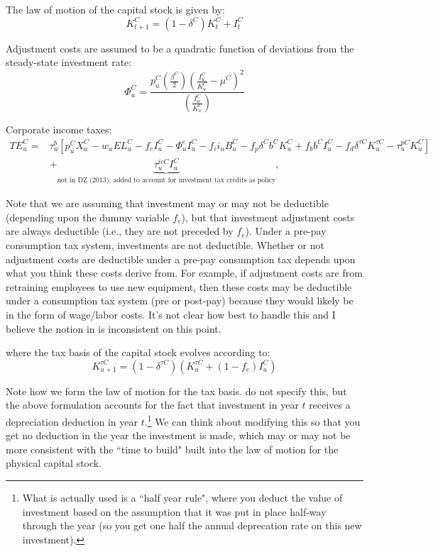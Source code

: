 The law of motion of the capital stock is given by:
\begin{equation}
\label{eqn:lom_capital}
K^{C}_{t+1}=(1-\delta^{C})K^{C}_{t} + I^{C}_{t}
\end{equation}

Adjustment costs are assumed to be a quadratic function of deviations from the steady-state investment rate:
\begin{equation}
\label{eqn:adj_cost}
\Phi^{C}_{u}=\frac{p^{C}_{u}\left(\frac{\beta^{C}}{2}\right)\left(\frac{I^{C}_{u}}{K^{C}_{u}}-\mu^{C}\right)^{2}}{\left(\frac{I^{C}_{u}}{K^{C}_{u}}\right)}
\end{equation}

Corporate income taxes:
\begin{equation}
\label{eqn:corp_tax}
\begin{split}
TE^{C}_{u}= & \tau^{b}_{u}\left[p^{C}_{u}X^{C}_{u}-w_{u}EL^{C}_{u}-f_{e}I^{C}_{u}-\Phi^{c}_{u}I^{C}_{u}-f_{i}i_{u}B^{C}_{u}-f_{p}\delta^{C}b^{C}K^{C}_{u}+f_{b}b^{C}I^{C}_{u}-f_{d}\delta^{\tau C}K^{\tau C}_{u}-\tau^{pC}_{u}K^{C}_{u}\right] \\
& +\underbrace{\tau^{icC}_{u}I^{C}_{u}}_{\text{not in DZ (2013), added to account for investment tax credits as policy}},
\end{split}
\end{equation}

\noindent\noindent  Note that we are assuming that investment may or may not be deductible (depending upon the dummy variable $f_{e}$), but that investment adjustment costs are always deductible (i.e., they are not preceded by $f_{e}$).  Under a pre-pay consumption tax system, investments are not deductible.  Whether or not adjustment costs are deductible under a pre-pay consumption tax depends upon what you think these costs derive from.  For example, if adjustment costs are from retraining employees to use new equipment, then these costs may be deductible under a consumption tax system (pre or post-pay) because they would likely be in the form of wage/labor costs. It's not clear how best to handle this and I believe the notion in \citet{DZ2013} is inconsistent on this point.

\noindent\noindent where the tax basis of the capital stock evolves according to:
\begin{equation}
\label{eqn:lom_taxcapital}
K^{\tau C}_{u+1}=(1-\delta^{\tau C})(K^{\tau C}_{u} + (1-f_{e})I^{C}_{u})
\end{equation}

Note how we form the law of motion for the tax basis.  \citet{DZ2013} do not specify this, but the above formulation accounts for the fact that investment in year $t$ receives a depreciation deduction in year $t$.\footnote{What is actually used is a ``half year rule", where you deduct the value of investment based on the assumption that it was put in place half-way through the year (so you get one half the annual deprecation rate on this new investment).}  We can think about modifying this so that you get no deduction in the year the investment is made, which may or may not be more consistent with the ``time to build" built into the law of motion for the physical capital stock.

